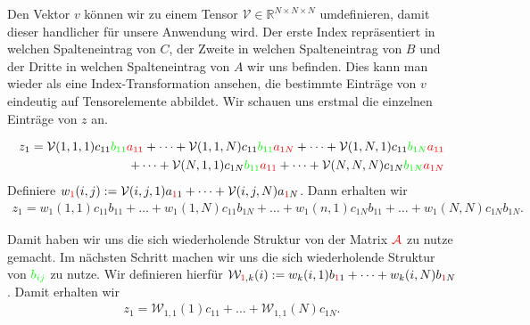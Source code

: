 Den Vektor $v$ können wir zu einem Tensor $\mathcal{V} \in \mathbb{R}^{N \times N \times N} $ umdefinieren, damit dieser handlicher für unsere Anwendung wird. Der erste Index repräsentiert in welchen Spalteneintrag von $C$, der Zweite in welchen Spalteneintrag von $B$ und der Dritte in welchen Spalteneintrag von $A$ wir uns befinden. Dies kann man wieder als eine Index-Transformation ansehen, die bestimmte Einträge von $v$ eindeutig auf Tensorelemente abbildet. 
Wir schauen uns erstmal die einzelnen Einträge von $z$ an. 

\begin{equation*} \label{eq:zold}
\begin{aligned}
z_{1} = \mathcal{V}(1,1,1) c_{11} \textcolor{green}{b_{11}} \textcolor{red}{a_{11}}+ \dots +  \mathcal{V}(1,1,N) c_{11} \textcolor{green}{b_{11}} \textcolor{red}{a_{1N}} + \dots  +  \mathcal{V}(1,N,1)c_{11} 
\textcolor{green}{b_{1N}} \textcolor{red}{a_{11}} \\ + \dots +  \mathcal{V}(N,1,1) c_{1N} \textcolor{green}{b_{11}} \textcolor{red}{a_{11}} + \dots +  \mathcal{V}(N,N,N) c_{1N} \textcolor{green}{b_{1N}} \textcolor{red}{a_{1N}}
\end{aligned}
\end{equation*}
Definiere $w_{\textcolor{red}{1}}(i,j) :=\mathcal{V}(i,j,1) a_{\textcolor{red}{1}1}+\dots+\mathcal{V}(i,j,N) a_{\textcolor{red}{1}N}$. Dann erhalten wir
\begin{equation*}
\begin{aligned}
z_{1}= w_1(1,1) c_{11} b_{11} + \dots +   w_1(1,N) c_{11} b_{1N} + \dots + w_1(n,1) c_{1N} b_{11}  + \dots +  w_1(N,N) c_{1N} b_{1N}.
\end{aligned}
\end{equation*}

Damit haben wir uns die sich wiederholende Struktur von der Matrix $\textcolor{red}{\mathcal{A}}$ zu nutze gemacht. Im nächsten Schritt machen wir uns die sich wiederholende Struktur von $\textcolor{green}{b_{ij}}$ zu nutze.
Wir definieren hierfür $\mathcal{W}_{\textcolor{red}{1},k} (i):= w_k(i,1) b_{\textcolor{red}{1}1} + \dots + w_k(i,N) b_{\textcolor{red}{1}N}$. Damit erhalten wir
\begin{equation} \label{eq:znew}
\begin{aligned}
z_{1}= \mathcal{W}_{1,1}(1) c_{11}  + \dots +  \mathcal{W}_{1,1}(N) c_{1N}.
\end{aligned}
\end{equation}

